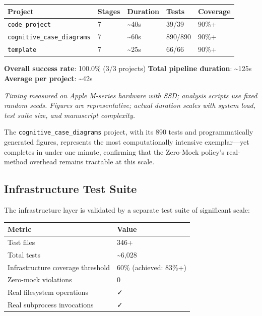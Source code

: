 \documentclass[
]{article}
\newcounter{none} %
\begin{document}
{\def\LTcaptype{none} %
\begin{longtable}[]{@{}lllll@{}}
\toprule\noalign{}
Project & Stages & Duration & Tests & Coverage \\
\midrule\noalign{}
\endhead
\bottomrule\noalign{}
\endlastfoot
\texttt{code\_project} & 7 & \textasciitilde40s & 39/39 & 90\%+ \\
\texttt{cognitive\_case\_diagrams} & 7 & \textasciitilde60s & 890/890 &
90\%+ \\
\texttt{template} & 7 & \textasciitilde25s & 66/66 & 90\%+ \\
\end{longtable}
}

\textbf{Overall success rate}: 100.0\% (3/3 projects) \textbf{Total
pipeline duration}: \textasciitilde125s \textbf{Average per project}:
\textasciitilde42s

\emph{Timing measured on Apple M-series hardware with SSD; analysis
scripts use fixed random seeds. Figures are representative; actual
duration scales with system load, test suite size, and manuscript
complexity.}

The \texttt{cognitive\_case\_diagrams} project, with its 890 tests and
programmatically generated figures, represents the most computationally
intensive exemplar---yet completes in under one minute, confirming that
the Zero-Mock policy's real-method overhead remains tractable at this
scale.

\subsection{Infrastructure Test Suite}\label{infrastructure-test-suite}

The infrastructure layer is validated by a separate test suite of
significant scale:

{\def\LTcaptype{none} %
\begin{longtable}[]{@{}ll@{}}
\toprule\noalign{}
Metric & Value \\
\midrule\noalign{}
\endhead
\bottomrule\noalign{}
\endlastfoot
Test files & 346+ \\
Total tests & \textasciitilde6,028 \\
Infrastructure coverage threshold & 60\% (achieved: 83\%+) \\
Zero-mock violations & 0 \\
Real filesystem operations & ✓ \\
Real subprocess invocations & ✓ \\
\end{longtable}
}
\end{document}
